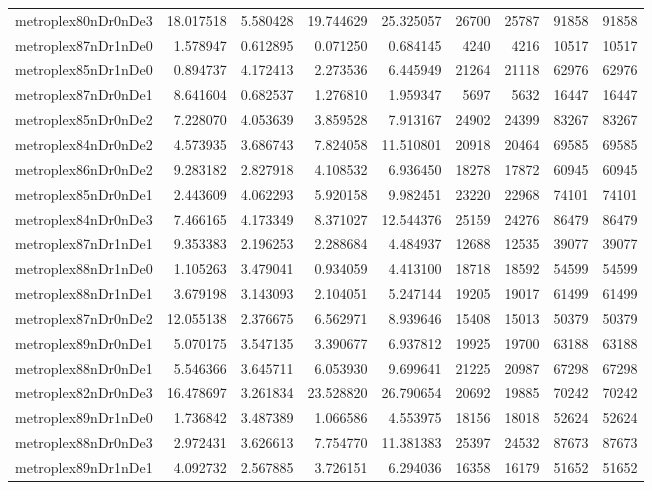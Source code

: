 \begin{longtable}{|l|r|r|r|r|r|r|r|r|}
metroplex80nDr0nDe3 & 18.017518 & 5.580428 & 19.744629 & 25.325057 & 26700 & 25787 & 91858 & 91858 \\
metroplex87nDr1nDe0 & 1.578947 & 0.612895 & 0.071250 & 0.684145 & 4240 & 4216 & 10517 & 10517 \\
metroplex85nDr1nDe0 & 0.894737 & 4.172413 & 2.273536 & 6.445949 & 21264 & 21118 & 62976 & 62976 \\
metroplex87nDr0nDe1 & 8.641604 & 0.682537 & 1.276810 & 1.959347 & 5697 & 5632 & 16447 & 16447 \\
metroplex85nDr0nDe2 & 7.228070 & 4.053639 & 3.859528 & 7.913167 & 24902 & 24399 & 83267 & 83267 \\
metroplex84nDr0nDe2 & 4.573935 & 3.686743 & 7.824058 & 11.510801 & 20918 & 20464 & 69585 & 69585 \\
metroplex86nDr0nDe2 & 9.283182 & 2.827918 & 4.108532 & 6.936450 & 18278 & 17872 & 60945 & 60945 \\
metroplex85nDr0nDe1 & 2.443609 & 4.062293 & 5.920158 & 9.982451 & 23220 & 22968 & 74101 & 74101 \\
metroplex84nDr0nDe3 & 7.466165 & 4.173349 & 8.371027 & 12.544376 & 25159 & 24276 & 86479 & 86479 \\
metroplex87nDr1nDe1 & 9.353383 & 2.196253 & 2.288684 & 4.484937 & 12688 & 12535 & 39077 & 39077 \\
metroplex88nDr1nDe0 & 1.105263 & 3.479041 & 0.934059 & 4.413100 & 18718 & 18592 & 54599 & 54599 \\
metroplex88nDr1nDe1 & 3.679198 & 3.143093 & 2.104051 & 5.247144 & 19205 & 19017 & 61499 & 61499 \\
metroplex87nDr0nDe2 & 12.055138 & 2.376675 & 6.562971 & 8.939646 & 15408 & 15013 & 50379 & 50379 \\
metroplex89nDr0nDe1 & 5.070175 & 3.547135 & 3.390677 & 6.937812 & 19925 & 19700 & 63188 & 63188 \\
metroplex88nDr0nDe1 & 5.546366 & 3.645711 & 6.053930 & 9.699641 & 21225 & 20987 & 67298 & 67298 \\
metroplex82nDr0nDe3 & 16.478697 & 3.261834 & 23.528820 & 26.790654 & 20692 & 19885 & 70242 & 70242 \\
metroplex89nDr1nDe0 & 1.736842 & 3.487389 & 1.066586 & 4.553975 & 18156 & 18018 & 52624 & 52624 \\
metroplex88nDr0nDe3 & 2.972431 & 3.626613 & 7.754770 & 11.381383 & 25397 & 24532 & 87673 & 87673 \\
metroplex89nDr1nDe1 & 4.092732 & 2.567885 & 3.726151 & 6.294036 & 16358 & 16179 & 51652 & 51652 \\

\end{longtable}
